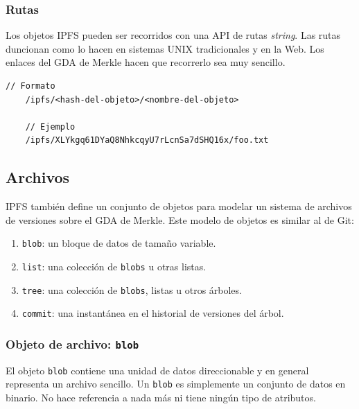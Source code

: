 \documentclass[12pt]{article} %
\begin{document}
\subsubsection{Rutas} %
\label{ssub:rutas}

Los objetos IPFS pueden ser recorridos con una API de rutas \textit{string}. Las rutas duncionan como lo hacen en sistemas UNIX tradicionales y en la Web. Los enlaces del GDA de Merkle hacen que recorrerlo sea muy sencillo.

\begin{lstlisting}[caption={Rutas en IPFS.}]
	// Formato
	/ipfs/<hash-del-objeto>/<nombre-del-objeto>

	// Ejemplo
	/ipfs/XLYkgq61DYaQ8NhkcqyU7rLcnSa7dSHQ16x/foo.txt
\end{lstlisting}



\subsection{Archivos} %
\label{sub:archivos}

IPFS también define un conjunto de objetos para modelar un sistema de archivos de versiones sobre el GDA de Merkle. Este modelo de objetos es similar al de Git:
\begin{enumerate}
	\item \texttt{blob}: un bloque de datos de tamaño variable.
	\item \texttt{list}: una colección de \texttt{blobs} u otras listas.
	\item \texttt{tree}: una colección de \texttt{blobs}, listas u otros árboles.
	\item \texttt{commit}: una instantánea en el historial de versiones del árbol.
\end{enumerate}

\subsubsection{Objeto de archivo: \texttt{blob}} %
\label{ssub:objeto_de_archivo_blob}

El objeto \texttt{blob} contiene una unidad de datos direccionable y en general representa un archivo sencillo. Un \texttt{blob} es simplemente un conjunto de datos en binario. No hace referencia a nada más ni tiene ningún tipo de atributos.
\end{document}
